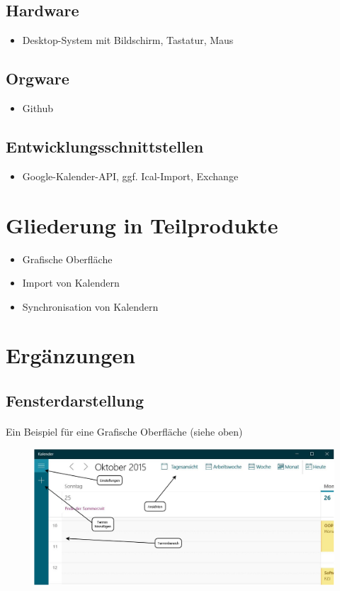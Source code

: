 \documentclass[a4paper]{article}
\begin{document}
    \subsection{Hardware}
	      \begin{itemize}
	      	\item Desktop-System mit Bildschirm, Tastatur, Maus
	      \end{itemize}
    \subsection{Orgware}
	      \begin{itemize}
					\item Github
	      \end{itemize}
    \subsection{Entwicklungsschnittstellen}
	      \begin{itemize}
	      	\item Google-Kalender-API, ggf. Ical-Import, Exchange
	      \end{itemize}

  \section{Gliederung in Teilprodukte}
    \begin{itemize}
      \item Grafische Oberfläche
		  \item Import von Kalendern
		  \item Synchronisation von Kalendern
    \end{itemize}
  \section{Ergänzungen}
  	\subsection{Fensterdarstellung}
  	\paragraph{}
  	Ein Beispiel für eine Grafische Oberfläche (siehe oben)
  	
  	
	\begin{figure}
		\centering
		\includegraphics[width=0.9\linewidth]{Fensterdarstellung}
		\caption{}
		\label{Fensterdarstellung}
	\end{figure}
\end{document}
